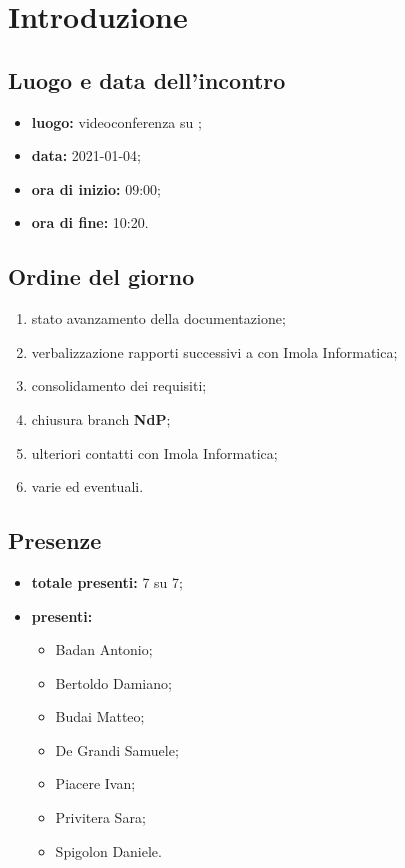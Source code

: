 \section*{Introduzione}
\subsection*{Luogo e data dell'incontro}
\begin{itemize}
	\item \textbf{luogo:} videoconferenza su ;
	\item \textbf{data:} 2021-01-04;
	\item \textbf{ora di inizio:} 09:00;
	\item \textbf{ora di fine:} 10:20.
\end{itemize}
\subsection*{Ordine del giorno}
\begin{enumerate}
	\item stato avanzamento della documentazione;
	\item verbalizzazione rapporti successivi a  con Imola Informatica;
	\item consolidamento dei requisiti;
	\item chiusura branch \textbf{NdP};
	\item ulteriori contatti con Imola Informatica;
	\item varie ed eventuali.
\end{enumerate}
\subsection*{Presenze}
\begin{itemize}
	\item \textbf{totale presenti:} 7 su 7;
	\item \textbf{presenti: }
	\begin{itemize}
		\item Badan Antonio;
		\item Bertoldo Damiano;
		\item Budai Matteo;
		\item De Grandi Samuele;
		\item Piacere Ivan;
		\item Privitera Sara;
		\item Spigolon Daniele.
	\end{itemize}
\end{itemize}

